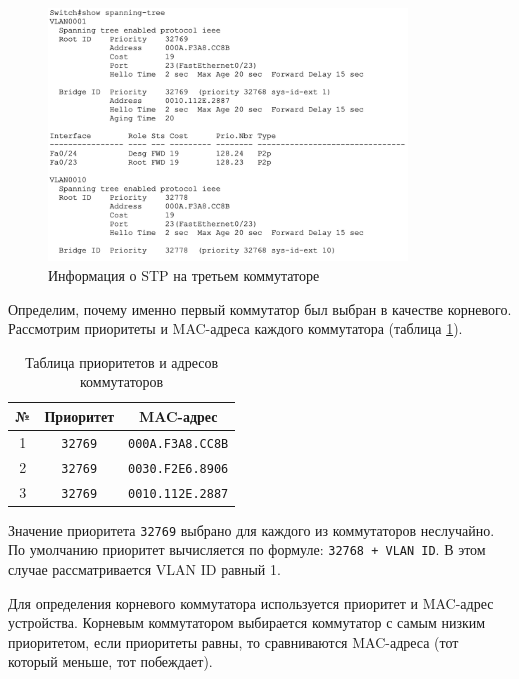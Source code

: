 \documentclass[a4paper, 14pt]{extarticle}
\begin{document}
\begin{figure}[H]
  \centering
  \includegraphics[width=0.85\textwidth]{images/stp/switch-3.png}
  \caption{Информация о STP на третьем коммутаторе}
  \label{fig:stp-switch-3}
\end{figure}

Определим, почему именно первый коммутатор был выбран в качестве корневого.
Рассмотрим приоритеты и MAC-адреса каждого коммутатора (таблица
\ref{tab:stp-switch}).

\begin{table}[H]
  \centering
  \renewcommand*{\arraystretch}{1.25}
  \setlength{\tabcolsep}{12pt}

  \caption{Таблица приоритетов и адресов коммутаторов}
  \label{tab:stp-switch}
  \begin{tabular}{|c|c|c|}
    \hline
    \textbf{№} & \textbf{Приоритет} & \textbf{MAC-адрес}      \\
    \hline
    1          & \texttt{32769}     & \texttt{000A.F3A8.CC8B} \\
    \hline
    2          & \texttt{32769}     & \texttt{0030.F2E6.8906} \\
    \hline
    3          & \texttt{32769}     & \texttt{0010.112E.2887} \\
    \hline
  \end{tabular}
\end{table}

Значение приоритета \texttt{32769} выбрано для каждого из коммутаторов
неслучайно. По умолчанию приоритет вычисляется по формуле: \texttt{32768 + VLAN
  ID}. В этом случае рассматривается VLAN ID равный 1.

Для определения корневого коммутатора используется приоритет и MAC-адрес
устройства. Корневым коммутатором выбирается коммутатор с самым низким
приоритетом, если приоритеты равны, то сравниваются MAC-адреса (тот который
меньше, тот побеждает).
\end{document}
